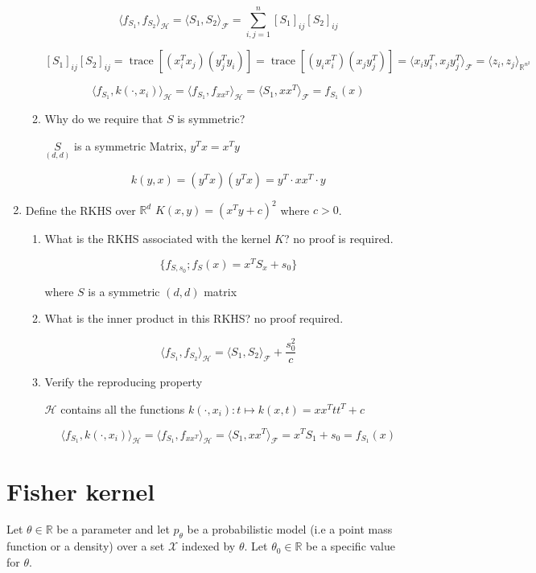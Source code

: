 \documentclass[11pt]{article}
\DeclareMathOperator{\trace}{trace}
\begin{document}
\begin{enumerate}
\begin{enumerate}
$$\langle f_{S_1},f_{S_2}\rangle_{\mathcal{H}}=\langle S_1,S_2\rangle_{\mathcal{F}}=\sum\limits_{i,j=1}^n[S_1]_{ij}[S_2]_{ij}$$


$$[S_1]_{ij}[S_2]_{ij}=\trace[(x_i^Tx_j)(y_j^Ty_i)]=\trace[(y_ix_i^T)(x_jy_j^T)]=\langle x_iy_i^T,x_jy_j^T\rangle_{\mathcal{F}}=\langle z_i,z_j\rangle_{\mathbb{R}^{n^2}}$$

$$ \langle f_{S_1},k(\cdot,x_i)\rangle_{\mathcal{H}}=\langle f_{S_1},f_{xx^T}\rangle_{\mathcal{H}}=\langle S_1,xx^T\rangle_{\mathcal{F}}= f_{S_1}(x)$$


\item Why do we require that $S$ is symmetric?
 
$\underset{(d,d)}{S}$ is a symmetric Matrix,
$y^Tx=x^Ty$

$$k(y,x)=(y^Tx)(y^Tx)=y^T\cdot xx^T\cdot y$$

\end{enumerate}

\item Define the RKHS  over $\mathbb{R}^d$ $K(x,y)=(x^Ty+c)^2$ where $c>0$. 

\begin{enumerate}
\item What is the RKHS associated with the kernel $K$? no proof is required. 

$$\{f_{S,s_0}; f_S(x)=x^T S_x+s_0\}$$

where $S$ is a symmetric $(d,d)$ matrix

\item What is the inner product in this RKHS? no proof required.  


$$\langle f_{S_1},f_{S_2}\rangle_{\mathcal{H}}=\langle S_1,S_2\rangle_{\mathcal{F}}+\frac{s_0^2}c$$

\item Verify the reproducing property

$\mathcal{H}$ contains all the functions $k(\cdot,x_i): t\mapsto k(x,t)=xx^Ttt^T+c$

$$ \langle f_{S_1},k(\cdot,x_i)\rangle_{\mathcal{H}}=\langle f_{S_1},f_{xx^T}\rangle_{\mathcal{H}}=\langle S_1,xx^T\rangle_{\mathcal{F}}=x^T S_1+s_0= f_{S_1}(x)$$

\end{enumerate}

\end{enumerate}




\section{Fisher kernel} 
Let $\theta \in \mathbb{R}$ be a parameter and let $p_\theta$ be a probabilistic model (i.e a point mass function or a density) over a set $\mathcal{X}$ indexed by $\theta$. Let $\theta_0 \in \mathbb{R}$ be a specific value for $\theta$.
\end{document}
